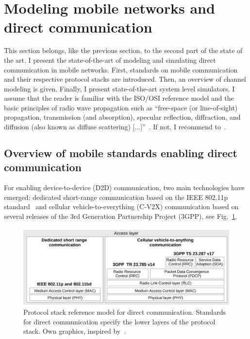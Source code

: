 \section{Modeling mobile networks and direct communication}

\label{sec:modelcom}


This section belongs, like the previous section, to the second part of the state of the art. I present the state-of-the-art of modeling and simulating direct communication in mobile networks. First, standards on mobile communication and their respective protocol stacks are introduced. Then, an overview of channel modeling is given. Finally, I present state-of-the-art system level simulators. I assume that the reader is familiar with the ISO/OSI reference model and the basic principles of radio wave propagation such as \enquote{free-space (or line-of-sight) propagation, transmission (and absorption), specular reflection, diffraction, and diffusion (also known as diffuse scattering) [...]}~\cite{rappaport-2001-com}. If not, I recommend to~\cite{rappaport-2001-com}.



\subsection{Overview of mobile standards enabling direct communication}

For enabling device-to-device (D2D) communication, two main technologies have emerged: dedicated short-range communication based on the IEEE 802.11p standard~\cite{802.11p-2010-com} and cellular vehicle-to-everything (C-V2X) communication based on several releases of the 3rd Generation Partnership Project (3GPP), see Fig.~\ref{fig:protocollstack}.


\begin{figure}[hbt!]
\centering
\includegraphics[width=\textwidth]{../figures/state-of-the-art/mobilecommunication/protocollstacks.pdf} 
\caption{Protocol stack reference model for direct communication. Standards for direct communication specify the lower layers of the protocol stack.  Own graphics, inspired by~\cite[p.89]{chen-2023-com}. }
\label{fig:protocollstack}
\end{figure}



